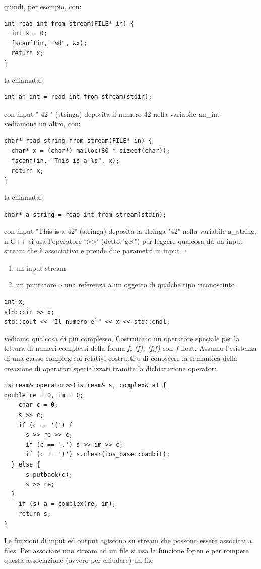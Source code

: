 \documentclass[a4paper,12pt, oneside]{book}
\begin{document}
quindi, per esempio, con:
\begin{verbatim}
int read_int_from_stream(FILE* in) {
  int x = 0;
  fscanf(in, "%d", &x);
  return x;
}
\end{verbatim}
la chiamata:
\begin{verbatim}
int an_int = read_int_from_stream(stdin);
\end{verbatim}
con input " 42 " (stringa) deposita il numero 42 nella variabile
an\_int\\
vediamone un altro, con:
\begin{verbatim}
char* read_string_from_stream(FILE* in) {
  char* x = (char*) malloc(80 * sizeof(char));
  fscanf(in, "This is a %s", x);
  return x;
}
\end{verbatim}
la chiamata:
\begin{verbatim}
char* a_string = read_int_from_stream(stdin);
\end{verbatim}
con input "This is a 42" (stringa) deposita la stringa "42"
nella variabile a\_string.\\
n C++ si usa l'operatore ‘>>‘ (detto "get") per leggere qualcosa da un input stream che è associativo e prende due parametri in input\_:
\begin{enumerate}
\item un input stream
\item un puntatore o una referenza a un oggetto di qualche tipo riconosciuto
\end{enumerate}
\begin{verbatim}
int x;
std::cin >> x;
std::cout << "Il numero e`" << x << std::endl;
\end{verbatim}
vediamo qualcosa di più complesso, Costruiamo un operatore speciale per la lettura di numeri
complessi della forma \textit{f, (f), (f,f)} con $f$ float. Assumo l'esistenza di una classe complex coi relativi costrutti e di conoscere la semantica della creazione di operatori specializzati
tramite la dichiarazione operator:
\begin{verbatim}
istream& operator>>(istream& s, complex& a) {
double re = 0, im = 0;
    char c = 0;
    s >> c;
    if (c == '(') {
      s >> re >> c;
      if (c == ',') s >> im >> c;
      if (c != ')') s.clear(ios_base::badbit);
  } else {
      s.putback(c);
      s >> re;
  }
    if (s) a = complex(re, im);
    return s;
}
\end{verbatim}
Le funzioni di input ed output agiscono su stream che possono
essere associati a files. Per associare uno stream ad un file si usa la funzione fopen e per rompere questa associazione (ovvero per chiudere) un file
\end{document}
